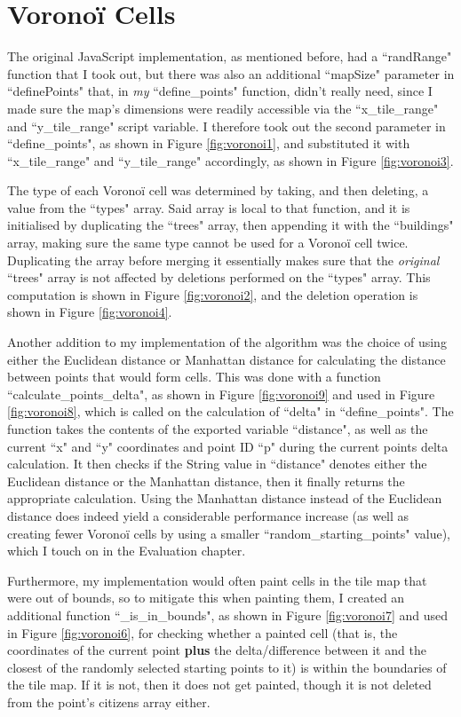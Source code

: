 \section{Voronoï Cells}

The original JavaScript implementation, as mentioned before, had a ``randRange" function that I took out, but there was also an additional ``mapSize" parameter in ``definePoints" that, in \textit{my} ``define\_points" function, didn't really need, since I made sure the map's dimensions were readily accessible via the ``x\_tile\_range" and ``y\_tile\_range" script variable. I therefore took out the second parameter in ``define\_points", as shown in Figure \ref{fig:voronoi1}, and substituted it with ``x\_tile\_range" and ``y\_tile\_range" accordingly, as shown in Figure \ref{fig:voronoi3}.

The type of each Voronoï cell was determined by taking, and then deleting, a value from the ``types" array. Said array is local to that function, and it is initialised by duplicating the ``trees" array, then appending it with the ``buildings" array, making sure the same type cannot be used for a Voronoï cell twice. Duplicating the array before merging it essentially makes sure that the \textit{original} ``trees" array is not affected by deletions performed on the ``types" array. This computation is shown in Figure \ref{fig:voronoi2}, and the deletion operation is shown in Figure \ref{fig:voronoi4}.

Another addition to my implementation of the algorithm was the choice of using either the Euclidean distance or Manhattan distance for calculating the distance between points that would form cells. This was done with a function ``calculate\_points\_delta", as shown in Figure \ref{fig:voronoi9} and used in Figure \ref{fig:voronoi8}, which is called on the calculation of ``delta" in ``define\_points". The function takes the contents of the exported variable ``distance", as well as the current ``x" and ``y" coordinates and point ID ``p" during the current points delta calculation. It then checks if the String value in ``distance" denotes either the Euclidean distance or the Manhattan distance, then it finally returns the appropriate calculation. Using the Manhattan distance instead of the Euclidean distance does indeed yield a considerable performance increase (as well as creating fewer Voronoï cells by using a smaller ``random\_starting\_points" value), which I touch on in the Evaluation chapter.

Furthermore, my implementation would often paint cells in the tile map that were out of bounds, so to mitigate this when painting them, I created an additional function ``\_is\_in\_bounds", as shown in Figure \ref{fig:voronoi7} and used in Figure \ref{fig:voronoi6}, for checking whether a painted cell (that is, the coordinates of the current point \textbf{plus} the delta/difference between it and the closest of the randomly selected starting points to it) is within the boundaries of the tile map. If it is not, then it does not get painted, though it is not deleted from the point's citizens array either.


